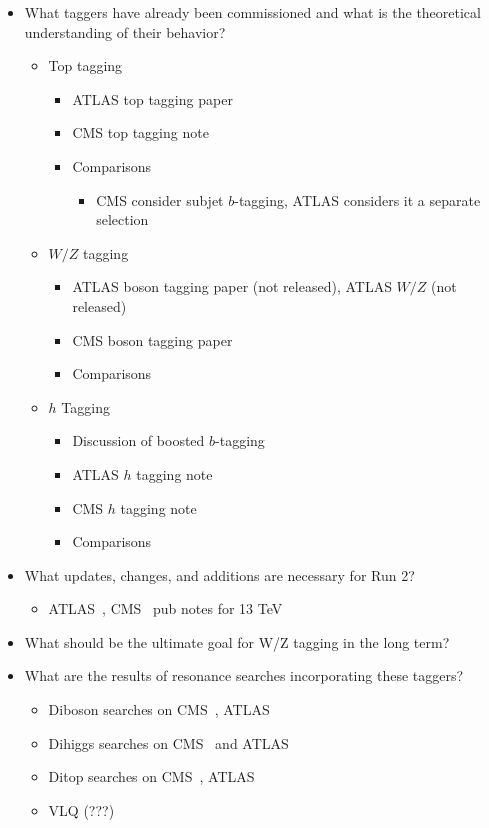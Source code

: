 \label{tagging}

\begin{itemize}
\item What taggers have already been commissioned and what is the theoretical understanding of their behavior?
\begin{itemize}
	\item Top tagging
	\begin{itemize}
		\item ATLAS top tagging paper~\cite{ATLAS-TOP}
		\item CMS top tagging note~\cite{CMS-TOP}
		\item Comparisons
		\begin{itemize}
			\item CMS consider subjet $b$-tagging, ATLAS considers it a separate selection
		\end{itemize}
	\end{itemize}
	\item $W/Z$ tagging
	\begin{itemize}
		\item ATLAS boson tagging paper (not released), ATLAS $W/Z$ (not released)
		\item CMS boson tagging paper~\cite{CMS-W}
		\item Comparisons
	\end{itemize}
	\item $h$ Tagging
	\begin{itemize}
		\item Discussion of boosted $b$-tagging~\cite{ATLAS-B-Dense,ATLAS-B-Trackjet,CMS-B-Dense} 
		\item ATLAS $h$ tagging note
		\item CMS $h$ tagging note
		\item Comparisons
	\end{itemize}
\end{itemize}
\item What updates, changes, and additions are necessary for Run 2?
\begin{itemize}
	\item ATLAS~\cite{ATLAS-H-13,ATLAS-W-13}, CMS~\cite{CMS-B-13,CMS-WZT-13} pub notes for 13 TeV 
\end{itemize}
\item What should be the ultimate goal for W/Z tagging in the long term?
\item What are the results of resonance searches incorporating these taggers?
\begin{itemize}
	\item Diboson searches on CMS~\cite{CMS-WZ-AllHad,CMS-WZ-SemiL}, ATLAS~\cite{ATLAS-WZ-AllHad,ATLAS-WZ-SemiL,ATLAS-WZ-SemiL2}
	\item Dihiggs searches on CMS~\cite{CMS-HH} and ATLAS~\cite{ATLAS-HH}
	\item Ditop searches on CMS~\cite{CMS-Top-Resonances}, ATLAS~\cite{ATLAS-Top-Resonances}
	\item VLQ (???)
\end{itemize}
\end{itemize}